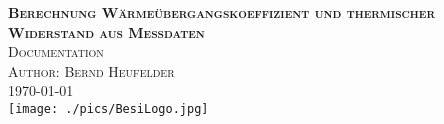 \documentclass[a4paper, 10pt]{scrartcl}
\begin{document}
	\begin{titlepage}
		\center 		
		\textsc{\huge \bfseries Berechnung Wärmeübergangskoeffizient und thermischer Widerstand aus Messdaten}\\[1cm] 
		\textsc{\Large Documentation}\\[0.5cm] 
		\textsc{\large Author: Bernd Heufelder}\\[0.5cm] 
		{\large \today}\\[1cm] 
		\texttt{[image: ./pics/BesiLogo.jpg]}\\[1cm]
		\begin{flushleft}
			\tableofcontents
		\end{flushleft}
	\end{titlepage}
		
\end{document}
